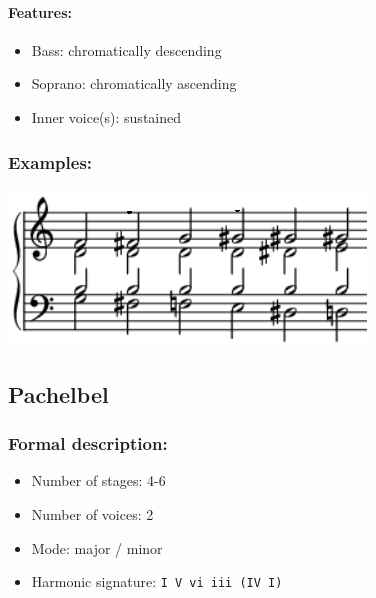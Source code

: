 ﻿\documentclass[11pt, openany]{article}
\begin{document}
\begin{itemize}
\paragraph{Features:}
\begin{itemize}
\item Bass: chromatically descending
\item Soprano: chromatically ascending
\item Inner voice(s): sustained
\end{itemize}

\subsubsection{Examples:}
\begin{center}
\includegraphics[scale=1]{omnibus.png}
\end{center}


	\subsection{Pachelbel}
	
\subsubsection{Formal description:}
\begin{itemize}
\item Number of stages: 4-6
\item Number of voices: 2
\item Mode: major / minor
\item Harmonic signature: \texttt{I V vi iii (IV I)}
\end{itemize}


\end{itemize}
\end{document}
